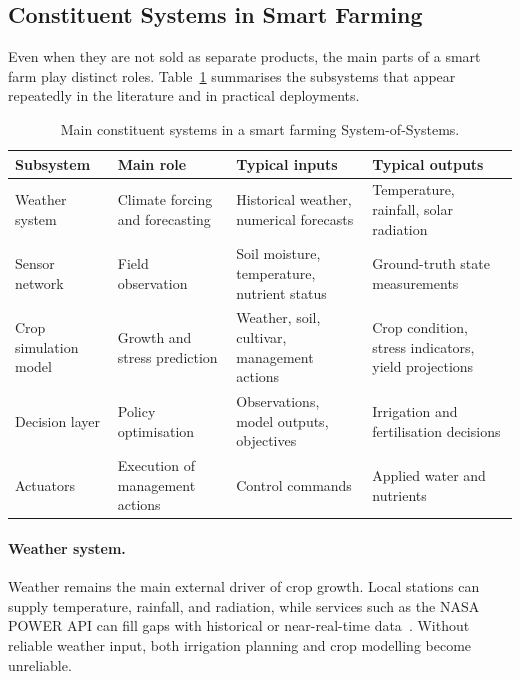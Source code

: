 \subsection{Constituent Systems in Smart Farming}

Even when they are not sold as separate products, the main parts of a smart farm
play distinct roles. Table~\ref{tab:smart_farm_subsystems} summarises the
subsystems that appear repeatedly in the literature and in practical deployments.

\begin{table}[ht]
  \centering
  \caption{Main constituent systems in a smart farming System-of-Systems.}
  \label{tab:smart_farm_subsystems}
  \begin{tabular}{p{2.8cm} p{3.5cm} p{3.5cm} p{3.8cm}}
    \toprule
    \textbf{Subsystem} & \textbf{Main role} & \textbf{Typical inputs} & \textbf{Typical outputs} \\
    \midrule
    Weather system &
    Climate forcing and forecasting &
    Historical weather, numerical forecasts &
    Temperature, rainfall, solar radiation \\[4pt]

    Sensor network &
    Field observation &
    Soil moisture, temperature, nutrient status &
    Ground-truth state measurements \\[4pt]

    Crop simulation model &
    Growth and stress prediction &
    Weather, soil, cultivar, management actions &
    Crop condition, stress indicators, yield projections \\[4pt]

    Decision layer &
    Policy optimisation &
    Observations, model outputs, objectives &
    Irrigation and fertilisation decisions \\[4pt]

    Actuators &
    Execution of management actions &
    Control commands &
    Applied water and nutrients \\
    \bottomrule
  \end{tabular}
\end{table}

\paragraph{Weather system.}
Weather remains the main external driver of crop growth. Local stations can
supply temperature, rainfall, and radiation, while services such as the NASA
POWER API can fill gaps with historical or near-real-time
data~\cite{hayat2025iot, codeluppi2020lorafarm}. Without reliable weather input,
both irrigation planning and crop modelling become unreliable.


